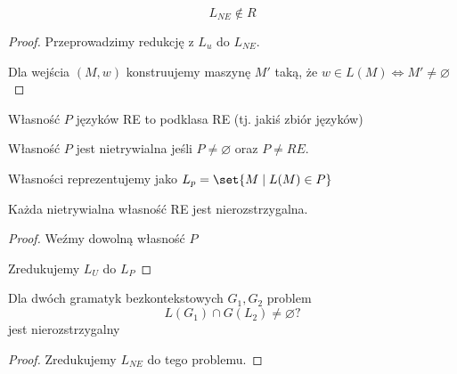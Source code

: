 \begin{lemma}
	\[ L_{NE} \notin R \]
\end{lemma}
\begin{proof}
	Przeprowadzimy redukcję z \( L_u\) do \( L_{NE} \).

	Dla wejścia \( (M, w) \) konstruujemy maszynę \( M' \) taką, że
	\( w \in L(M) \iff M' \neq \varnothing \)
\end{proof}

\begin{definition}
	Własność \( P \) języków RE to podklasa RE (tj. jakiś zbiór języków)

	Własność \( P \) jest nietrywialna jeśli \( P \neq \varnothing \) oraz \( P \neq RE \).

	Własności reprezentujemy jako \( L_p = \set{M \mid L(M) \in P} \)
\end{definition}

\begin{theorem}[Rice]
	Każda nietrywialna własność RE jest nierozstrzygalna.
\end{theorem}
\begin{proof}
	Weźmy dowolną własność \( P \)

	Zredukujemy \( L_U \) do \( L_P \)


\end{proof}

\begin{lemma}
	Dla dwóch gramatyk bezkontekstowych \( G_1, G_2 \) problem
	\[
		L(G_1) \cap G(L_2) \neq \varnothing ?
	\]
	jest nierozstrzygalny
\end{lemma}
\begin{proof}
	Zredukujemy \( L_{NE} \) do tego problemu.
\end{proof}
